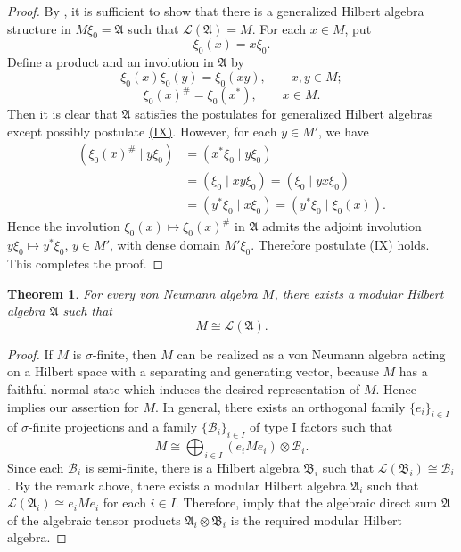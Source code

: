 \documentclass[12pt,b5paper,twoside]{article}
\theoremstyle{takesaki}
\newtheorem{theorem}{Theorem}[section]
\numberwithin{equation}{section}
\newcommand{\modcondref}[1]{\hyperref[cond:2.1:#1]{(#1)}}
\begin{document}
\begin{proof}
By , it is sufficient to show that there is a
generalized Hilbert algebra structure in $M\xi_0=\mathfrak A$ such
that $\mathcal L(\mathfrak A)=M$.  For each $x\in M$, put
\[
  \xi_0(x)=x\xi_0.
\]
Define a product and an involution in $\mathfrak A$ by
\[
 \xi_0(x)\xi_0(y)=\xi_0(xy),
 \qquad x,y\in M;
\]
\[
 \xi_0(x)^{\#}=\xi_0(x^*),
 \qquad x\in M.
\]
Then it is clear that $\mathfrak A$ satisfies the postulates for
  generalized Hilbert algebras except possibly postulate \modcondref{IX}.
However, for each $y\in M'$, we have
\begin{align*}
 (\xi_0(x)^{\#}\mid y\xi_0)
 &=(x^*\xi_0\mid y\xi_0)\\
 &=(\xi_0\mid xy\xi_0)=(\xi_0\mid yx\xi_0)\\
 &=(y^*\xi_0\mid x\xi_0)=(y^*\xi_0\mid\xi_0(x)).
\end{align*}
Hence the involution $\xi_0(x)\mapsto\xi_0(x)^{\#}$ in
$\mathfrak A$ admits the adjoint involution
$y\xi_0\mapsto y^*\xi_0$, $y\in M'$, with dense domain $M'\xi_0$.
  Therefore postulate \modcondref{IX} holds.  This completes the proof.
\end{proof}

\begin{theorem}\label{thm:12.2}
For every von Neumann algebra $M$, there exists a modular Hilbert
algebra $\mathfrak A$ such that
\[
  M\cong\mathcal L(\mathfrak A).
\]
\end{theorem}

\begin{proof}
If $M$ is $\sigma$-finite, then $M$ can be realized as a von Neumann
algebra acting on a Hilbert space with a separating and generating
vector, because $M$ has a faithful normal state which induces the
desired representation of $M$.  Hence  implies our
assertion for $M$.  In general, there exists an orthogonal family
$\{e_i\}_{i\in I}$ of $\sigma$-finite projections and a family
$\{\mathscr B_i\}_{i\in I}$ of type I factors such that
\[
 M\cong\bigoplus_{i\in I}(e_iMe_i)\otimes\mathscr B_i.
\]
Since each $\mathscr B_i$ is semi-finite, there is a Hilbert algebra
$\mathfrak B_i$ such that
$\mathcal L(\mathfrak B_i)\cong\mathscr B_i$.  By the remark above,
there
exists a modular Hilbert algebra $\mathfrak A_i$ such that
$\mathcal L(\mathfrak A_i)\cong e_iMe_i$ for each $i\in I$.
Therefore,  imply that the algebraic direct
sum $\mathfrak A$ of the algebraic tensor products
$\mathfrak A_i\otimes\mathfrak B_i$ is the required modular Hilbert
algebra.
\end{proof}
\end{document}
